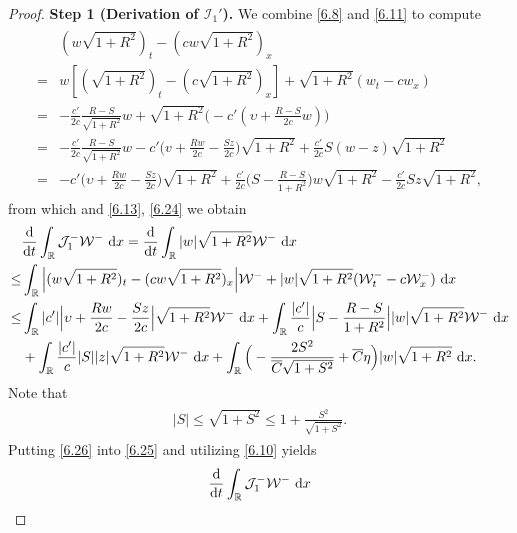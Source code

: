 \documentclass[11pt,reqno]{article}
\newcommand{\fr}{\frac}
\numberwithin{equation}{section}
\begin{document}
\begin{proof}
\textbf{Step 1 (Derivation of $\mathcal{I}_{1}'$).} We combine \eqref{6.8} and \eqref{6.11} to compute
\begin{align*}
\begin{split}
&(w\sqrt{1+R^2})_t-(cw\sqrt{1+R^2})_x \\
=& w[(\sqrt{1+R^2})_t -(c\sqrt{1+R^2})_x] +\sqrt{1+R^2}(w_t-cw_x) \\
=&-\fr{c'}{2c}\fr{R-S}{\sqrt{1+R^2}}w +\sqrt{1+R^2}\Big(-c'(\upsilon+\fr{R-S}{2c}w)\Big) \\
=&-\fr{c'}{2c}\fr{R-S}{\sqrt{1+R^2}}w -c'\Big(v+\fr{Rw}{2c}-\fr{Sz}{2c}\Big)\sqrt{1+R^2} +\fr{c'}{2c}S(w-z)\sqrt{1+R^2} \\
=&-c'\Big(\upsilon+\fr{Rw}{2c}-\fr{Sz}{2c}\Big)\sqrt{1+R^2}  +\fr{c'}{2c}\Big(S-\fr{R-S}{1+R^2}\Big)w\sqrt{1+R^2} -\fr{c'}{2c}Sz\sqrt{1+R^2},
\end{split}
\end{align*}
from which and \eqref{6.13}, \eqref{6.24} we obtain
\begin{align}\label{6.25}
\begin{split}
&\fr{{\rm d}}{{\rm d}t}\int_{\mathbb{R}} \mathcal{J}_{1}^-\mathcal{W}^-\ {\rm d}x=\fr{{\rm d}}{{\rm d}t}\int_{\mathbb{R}}|w|\sqrt{1+R^2}\mathcal{W}^-\ {\rm d}x \\
\leq &\int_{\mathbb{R}}\Big|(w\sqrt{1+R^2})_t -(cw\sqrt{1+R^2})_x\Big|\mathcal{W}^- +|w|\sqrt{1+R^2}(\mathcal{W}^{-}_t-c\mathcal{W}^{-}_x)\ {\rm d}x \\
\leq &\int_{\mathbb{R}}|c'|\Big|\upsilon+\fr{Rw}{2c}-\fr{Sz}{2c}\Big|\sqrt{1+R^2}\mathcal{W}^-\ {\rm d}x +\int_{\mathbb{R}}\fr{|c'|}{c}\Big|S-\fr{R-S}{1+R^2}\Big||w|\sqrt{1+R^2}\mathcal{W}^-\ {\rm d}x \\ &+\int_{\mathbb{R}}\fr{|c'|}{c}|S||z|\sqrt{1+R^2}\mathcal{W}^-\ {\rm d}x +\int_{\mathbb{R}}\Big(-\fr{2S^2}{\overline{C}\sqrt{1+S^2}}+\overline{C}\eta \Big)|w|\sqrt{1+R^2}\ {\rm d}x.
\end{split}
\end{align}
Note that
\begin{align}\label{6.26}
\begin{split}
|S|\leq \sqrt{1+S^2} \leq 1+\fr{S^2}{\sqrt{1+S^2}}.
\end{split}
\end{align}
Putting \eqref{6.26} into \eqref{6.25} and utilizing \eqref{6.10} yields
\begin{align}\label{6.27}
\begin{split}
&\fr{{\rm d}}{{\rm d}t}\int_{\mathbb{R}} \mathcal{J}_{1}^-\mathcal{W}^-\ {\rm d}x \\

\end{split}
\end{align}
\end{proof}
\end{document}
